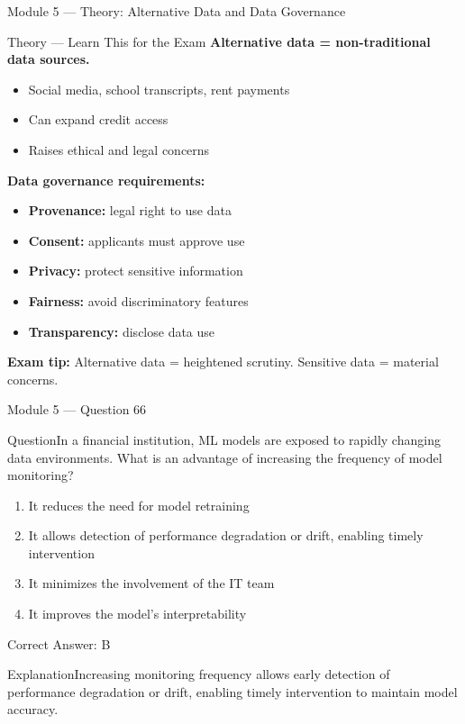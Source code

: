 \documentclass[aspectratio=169,10pt]{beamer}
\newcommand{\question}[1]{\begin{block}{Question}#1\end{block}}
\newcommand{\options}[4]{%
	\begin{enumerate}[label=\Alph*.,leftmargin=*]
		\item #1
		\item #2
		\item #3
		\item #4
	\end{enumerate}
}
\newcommand{\answerbox}[1]{\begin{exampleblock}{Correct Answer: #1}\end{exampleblock}}
\newcommand{\explain}[1]{\begin{block}{Explanation}#1\end{block}}
\newcommand{\theory}[1]{%
	\begin{block}{Theory --- Learn This for the Exam}
		\small #1
	\end{block}
}
\begin{document}
	\begin{frame}{Module 5 --- Theory: Alternative Data and Data Governance}
		\theory{
			\textbf{Alternative data = non-traditional data sources.}
			\begin{itemize}
				\item Social media, school transcripts, rent payments
				\item Can expand credit access
				\item Raises ethical and legal concerns
			\end{itemize}
			\textbf{Data governance requirements:}
			\begin{itemize}
				\item \textbf{Provenance:} legal right to use data
				\item \textbf{Consent:} applicants must approve use
				\item \textbf{Privacy:} protect sensitive information
				\item \textbf{Fairness:} avoid discriminatory features
				\item \textbf{Transparency:} disclose data use
			\end{itemize}
			\textbf{Exam tip:} Alternative data = heightened scrutiny. Sensitive data = material concerns.
		}
	\end{frame}
	
	\begin{frame}{Module 5 --- Question 66}
		\question{In a financial institution, ML models are exposed to rapidly changing data environments. What is an advantage of increasing the frequency of model monitoring?}
		\options{It reduces the need for model retraining}{It allows detection of performance degradation or drift, enabling timely intervention}{It minimizes the involvement of the IT team}{It improves the model's interpretability}
		\answerbox{B}
		\explain{Increasing monitoring frequency allows early detection of performance degradation or drift, enabling timely intervention to maintain model accuracy.}
	\end{frame}
	
\end{document}
